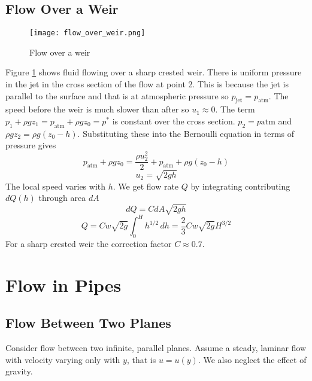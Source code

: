 \documentclass{article}
\begin{document}
    \subsection{Flow Over a Weir}
    \begin{figure}[ht]
        \centering
        \texttt{[image: flow\_over\_weir.png]}
        \caption{Flow over a weir}
        \label{fig:flow over weir}
    \end{figure}
    Figure \ref{fig:flow over weir} shows fluid flowing over a sharp crested weir.
    There is uniform pressure in the jet in the cross section of the flow at point 2.
    This is because the jet is parallel to the surface and that is at atmospheric pressure so \(p_\text{jet} = p_\text{atm}\).
    The speed before the weir is much slower than after so \(u_1\approx 0\).
    The term \(p_1 + \rho gz_1 = p_\text{atm} + \rho gz_0 = p^*\) is constant over the cross section.
    \(p_2 = p\text{atm}\) and \(\rho g z_2 = \rho g (z_0 - h)\).
    Substituting these into the Bernoulli equation in terms of pressure gives
    \[p_\text{atm} + \rho gz_0 = \frac{\rho u_2^2}{2} + p_\text{atm} + \rho g(z_0 - h)\]
    \[u_2 = \sqrt{2gh}\]
    The local speed varies with \(h\).
    We get flow rate \(Q\) by integrating contributing \(dQ(h)\) through area \(dA\)
    \[dQ = CdA\sqrt{2gh}\]
    \[Q = Cw\sqrt{2g}\int_0^Hh^{1/2}\,dh = \frac{2}{3}Cw\sqrt{2g}H^{3/2}\]
    For a sharp crested weir the correction factor \(C\approx 0.7\).
    
    \section{Flow in Pipes}
    \subsection{Flow Between Two Planes}
    Consider flow between two infinite, parallel planes.
    Assume a steady, laminar flow with velocity varying only with \(y\), that is \(u = u(y)\).
    We also neglect the effect of gravity.
\end{document}
